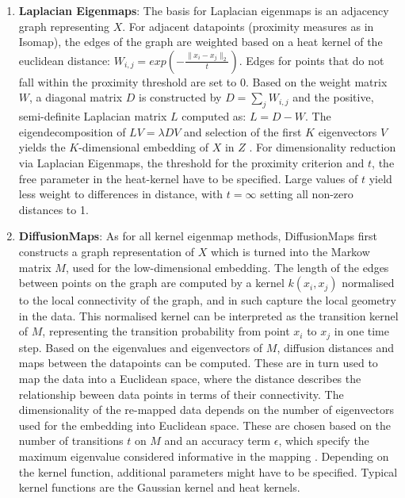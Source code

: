 \begin{enumerate}
\item\textbf{Laplacian Eigenmaps}: The basis for Laplacian eigenmaps is an adjacency graph representing \(X\). For adjacent datapoints (proximity measures as in Isomap), the edges of the graph are weighted based on a heat kernel of the euclidean distance: \(W_{i,j}=exp(-\frac{\lVert x_i - x_j\rVert_2}{t})\). Edges for points that do not fall within the proximity threshold are set to 0.  Based on the weight matrix \(W\), a diagonal matrix \(D\) is constructed by \(D = \sum_{j} W_{i,j}\) and the positive, semi-definite Laplacian matrix \(L\) computed as: \(L = D -W\). The eigendecomposition of \(LV =\lambda DV\) and selection of the first \(K\) eigenvectors \(V\) yields the \(K\)-dimensional embedding of \(X\) in \(Z\) \citep{Belkin2003}. For dimensionality reduction via Laplacian Eigenmaps, the threshold for the proximity criterion and \(t\), the free parameter in the heat-kernel have to be specified. Large values of \(t\) yield less weight to differences in distance, with \(t=\infty\) setting all non-zero distances to 1. 
 
\item\textbf{DiffusionMaps}: As for all kernel eigenmap methods, DiffusionMaps first constructs a graph representation of \(X\) which is turned into the Markow matrix \(M\), used for the low-dimensional embedding. The length of the edges between points on the graph are computed by a kernel \(k(x_i,x_j)\) normalised to the local connectivity of the graph, and in such capture the local geometry in the data. This normalised kernel can be interpreted as the transition kernel of \(M\), representing the transition probability from point \(x_i\) to \(x_j\) in one time step. Based on the eigenvalues and eigenvectors of \(M\), diffusion distances and maps between the datapoints can be computed. These are in turn used to map the data into a Euclidean space, where the distance describes the relationship beween data points in terms of their connectivity. The dimensionality of the re-mapped data depends on the number of eigenvectors used for the embedding into Euclidean space. These are chosen based on the number of transitions \(t\) on \(M\) and an accuracy term \(\epsilon\), which specify the maximum eigenvalue considered informative in the mapping \citep{Coifman2005,Coifman2006}. Depending on the kernel function, additional parameters might have to be specified. Typical kernel functions are the Gaussian kernel and  heat kernels.


\end{enumerate}
